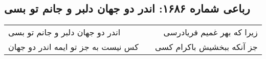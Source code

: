 \begin{center}
\section*{رباعی شماره ۱۶۸۶: اندر دو جهان دلبر و جانم تو بسی}
\label{sec:1686}
\begin{longtable}{l p{0.5cm} r}
اندر دو جهان دلبر و جانم تو بسی
&&
زیرا که بهر غمیم فریادرسی
\\
کس نیست به جز تو ایمه اندر دو جهان
&&
جز آنکه ببخشیش باکرام کسی
\\
\end{longtable}
\end{center}
